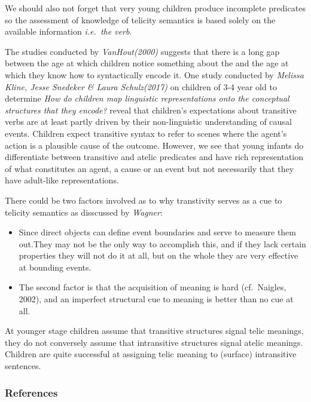 \documentclass[11pt]{article}
\providecommand{\tightlist}{%
      \setlength{\itemsep}{0pt}\setlength{\parskip}{0pt}}
\begin{document}
We should also not forget that very young children produce incomplete
predicates so the assessment of knowledge of telicity semantics is based
solely on the available information \emph{i.e.~the verb}.

The studies conducted by \emph{VanHout(2000)} suggests that there is a
long gap between the age at which children notice something about the
and the age at which they know how to syntactically encode it. One study
conducted by \emph{Melissa Kline, Jesse Snedeker \& Laura Schulz(2017)}
on children of 3-4 year old to determine \emph{How do children map
linguistic representations onto the conceptual structures that they
encode?} reveal that children's expectations about transitive verbs are
at least partly driven by their non-linguistic understanding of causal
events. Children expect transitive syntax to refer to scenes where the
agent's action is a plausible cause of the outcome. However, we see that
young infants do differentiate between transitive and atelic predicates
and have rich representation of what constitutes an agent, a cause or an
event but not necessarily that they have adult-like representations.

There could be two factors involved as to why transtivity serves as a
cue to telicity semantics as disscussed by \emph{Wagner}:

\begin{itemize}
\tightlist
\item
  Since direct objects can define event boundaries and serve to measure
  them out.They may not be the only way to accomplish this, and if they
  lack certain properties they will not do it at all, but on the whole
  they are very effective at bounding events.
\item
  The second factor is that the acquisition of meaning is hard
  (cf.~Naigles, 2002), and an imperfect structural cue to meaning is
  better than no cue at all.
\end{itemize}

At younger stage children assume that transitive structures signal telic
meanings, they do not conversely assume that intransitive structures
signal atelic meanings. Children are quite successful at assigning telic
meaning to (surface) intransitive sentences.

    \hypertarget{references}{%
\subsubsection{References}\label{references}}
\end{document}
